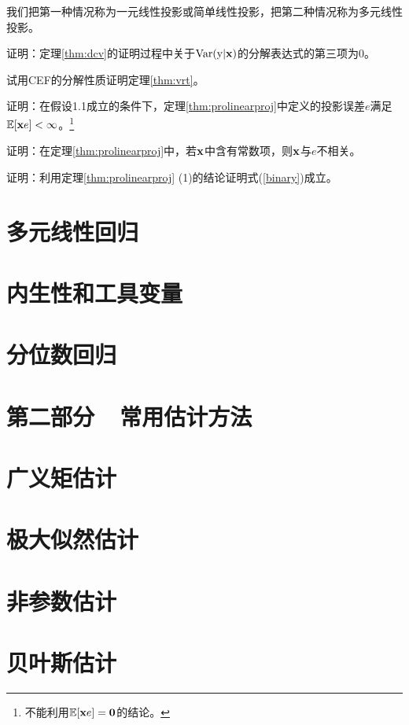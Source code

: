 \documentclass[cn,11pt,chinese]{elegantbook}
\begin{document}
我们把第一种情况称为一元线性投影或简单线性投影，把第二种情况称为多元线性投影。
\begin{problemset}
  \item 证明：定理\ref{thm:dcv}的证明过程中关于${\rm{Var}}({\rm{y}}|\bold{x})$的分解表达式的第三项为0。\label{ex1}
  \item 试用CEF的分解性质证明定理\ref{thm:vrt}。\label{ex2}
  \item 证明：在假设1.1成立的条件下，定理\ref{thm:prolinearproj}中定义的投影误差$e$满足$\mathbb{E}[\bold{x}e]<\infty$。\footnote{不能利用$\mathbb{E}[\bold{x}e]=\boldsymbol{0}$的结论。}
  \item 证明：在定理\ref{thm:prolinearproj}中，若$\bold{x}$中含有常数项，则$\bold{x}$与$e$不相关。\label{ex4}
  \item 证明：利用定理\ref{thm:prolinearproj} (1)的结论证明式(\ref{binary})成立。
\end{problemset}

\chapter{多元线性回归}
\chapter{内生性和工具变量}
\chapter{分位数回归}


\specialsectioning
\chapter{第二部分~~常用估计方法}
\setcounter{secnumdepth}{1}

\chapter{广义矩估计}

\chapter{极大似然估计}

\chapter{非参数估计}

\chapter{贝叶斯估计}
\end{document}
